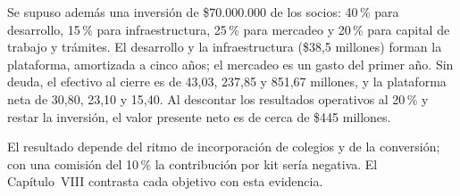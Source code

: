 Se supuso además una inversión de \$70.000.000 de los socios: 40\,\% para desarrollo, 15\,\% para
infraestructura, 25\,\% para mercadeo y 20\,\% para capital de trabajo y trámites. El desarrollo y la
infraestructura (\$38,5 millones) forman la plataforma, amortizada a cinco años; el mercadeo es un gasto del
primer año. Sin deuda, el efectivo al cierre es de 43,03, 237,85 y 851,67 millones, y la plataforma neta de
30,80, 23,10 y 15,40. Al descontar los resultados operativos al 20\,\% y restar la inversión, el valor
presente neto es de cerca de \$445 millones.

El resultado depende del ritmo de incorporación de colegios y de la conversión; con una comisión del 10\,\% la contribución por kit sería negativa. El Capítulo~VIII contrasta cada objetivo con esta evidencia.



